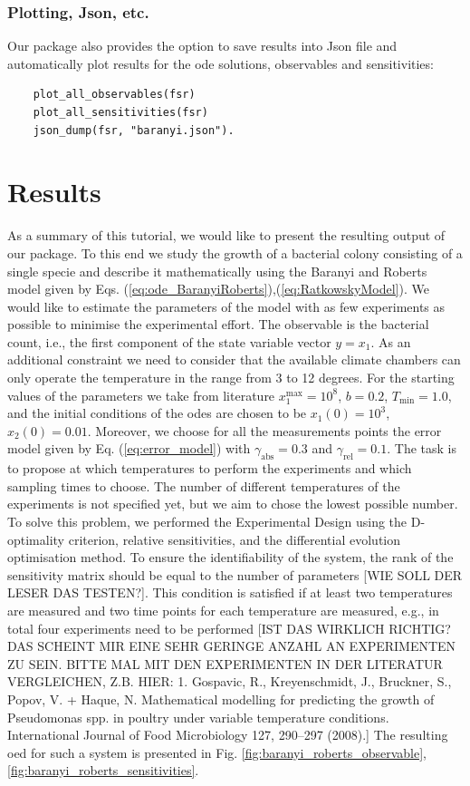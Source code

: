 \documentclass[10pt,A4paper]{article}
\begin{document}
\subsubsection*{Plotting, Json, etc.}
Our package also provides the option to save results into Json file and automatically plot results for the ode solutions, observables and sensitivities:
\begin{verbatim}
    plot_all_observables(fsr)
    plot_all_sensitivities(fsr)
    json_dump(fsr, "baranyi.json").
\end{verbatim}
%
%
%
\section*{Results}
As a summary of this tutorial, we would like to present the resulting output of our package.
To this end we study the growth of a bacterial colony consisting of a single specie and describe it mathematically using the Baranyi and Roberts model given by Eqs. (\ref{eq:ode_BaranyiRoberts}),(\ref{eq:RatkowskyModel}).
We would like to estimate the parameters of the model with as few experiments as possible to minimise the experimental effort.
The observable is the bacterial count, i.e., the first component of the state variable vector $y = x_1$.
As an additional constraint we need to consider that the available climate chambers can only operate the temperature in the range from 3 to 12 degrees.
For the starting values of the parameters we take from literature $x_1^\text{max}=10^8$, $b=0.2$, $T_\text{min}=1.0$, and the initial conditions of the \acp{ode} are chosen to be $x_1(0) = 10^3$, $x_2(0)=0.01$.
Moreover, we choose for all the measurements points the error model given by Eq. (\ref{eq:error_model}) with $\gamma_\text{abs}=0.3$ and $\gamma_\text{rel}=0.1$.
The task is to propose at which temperatures to perform the experiments and which sampling times to choose.
The number of different temperatures of the experiments is not specified yet, but we aim to chose the lowest possible number.
To solve this problem, we performed the Experimental Design using the D-optimality criterion, relative sensitivities, and the differential evolution optimisation method.
To ensure the identifiability of the system, the rank of the sensitivity matrix should be equal to the number of parameters [WIE SOLL DER LESER DAS TESTEN?].
This condition is satisfied if at least two temperatures are measured and two time points for each temperature are measured, e.g., in total four experiments need to be performed 
[IST DAS WIRKLICH RICHTIG? DAS SCHEINT MIR EINE SEHR GERINGE ANZAHL AN EXPERIMENTEN ZU SEIN. BITTE MAL MIT DEN EXPERIMENTEN IN DER LITERATUR VERGLEICHEN, Z.B. HIER: 1. Gospavic, R., Kreyenschmidt, J., Bruckner, S., Popov, V. + Haque, N. Mathematical modelling for predicting the growth of Pseudomonas spp. in poultry under variable temperature conditions. International Journal of Food Microbiology 127, 290–297 (2008).]
The resulting \ac{oed} for such a system is presented in Fig. \ref{fig:baranyi_roberts_observable}, \ref{fig:baranyi_roberts_sensitivities}.
\end{document}

